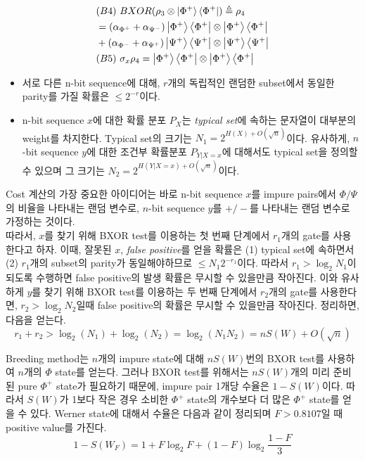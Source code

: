 \documentclass[
]{kaohandt}
\begin{document}
{\begin{equation*}
\begin{aligned}
        &(B4)\ BXOR (\rho_3  \otimes \ket{\Phi^+}\bra{\Phi^+}) \triangleq \rho_4 \\
        & =  (\alpha_{\Phi^+} + \alpha_{\Psi^-}) \left|\Phi^{+}\right\rangle\left\langle\Phi^{+}\right| \otimes\left|\Phi^{+}\right\rangle\left\langle\Phi^{+}\right| \\ 
        & + (\alpha_{\Phi^-} + \alpha_{\Psi^+}) \left|\Psi^{+}\right\rangle\left\langle\Psi^{+}\right| \otimes\left|\Psi^{+}\right\rangle\left\langle\Psi^{+}\right| \\
        &(B5)\ \sigma_x \rho_4 = \left|\Phi^{+}\right\rangle\left\langle\Phi^{+}\right| \otimes\left|\Phi^{+}\right\rangle\left\langle\Phi^{+}\right| 
    \end{aligned}
\end{equation*}}
\begin{itemize}
    \item 서로 다른 n-bit sequence에 대해, $r$개의 독립적인 랜덤한 subset에서 동일한 parity를 가질 확률은 $\leq 2^{-r}$이다.
	\item n-bit sequence $x$에 대한 확률 분포 $P_X$는 \textit{typical set}에 속하는 문자열이 대부분의 weight를 차지한다. Typical set의 크기는 $N_1 = 2^{H(X) + O(\sqrt{n})}$이다. 유사하게, $n$-bit sequence $y$에 대한 조건부 확률분포 $P_{Y|X=x}$에 대해서도 typical set을 정의할 수 있으며 그 크기는 $N_2 = 2^{H(Y|X=x) + O(\sqrt n)}$이다.
\end{itemize}

Cost 계산의 가장 중요한 아이디어는 바로 n-bit sequence $x$를 impure pairs에서 $\Phi / \Psi$의 비율을 나타내는 랜덤 변수로, $n$-bit sequence $y$를 $+/-$를 나타내는 랜덤 변수로 가정하는 것이다.\\
따라서, $x$를 찾기 위해 BXOR test를 이용하는 첫 번째 단계에서 $r_1$개의 gate를 사용한다고 하자. 이때, 잘못된 $x$, \textit{false positive}를 얻을 확률은 (1) typical set에 속하면서 (2) $r_1$개의 subset의 parity가 동일해야하므로 $\le N_1 2^{-r_1}$이다. 따라서 $r_1 > \log_2 N_1$이 되도록 수행하면 false positive의 발생 확률은 무시할 수 있을만큼 작아진다.  이와 유사하게 $y$를 찾기 위해 BXOR test를 이용하는 두 번째 단계에서 $r_2$개의 gate를 사용한다면, $r_2 > \log_2 N_2$일때 false positive의 확률은 무시할 수 있을만큼 작아진다. 정리하면, 다음을 얻는다.
\begin{equation}
    r_1 + r_2 > \log_2(N_1) + \log_2 (N_2) = \log_2(N_1N_2) = nS(W) + O(\sqrt n)
\end{equation}

Breeding method는 $n$개의 impure state에 대해 $nS(W)$번의 BXOR test를 사용하여 $n$개의 $\Phi$ state를 얻는다. 그러나 BXOR test를 위해서는 $nS(W)$개의 미리 준비된 pure $\Phi^+$ state가 필요하기 때문에, impure pair 1개당 수율은 $1-S(W)$이다. 따라서 $S(W)$가 1보다 작은 경우 소비한 $\Phi^+$ state의 개수보다 더 많은 $\Phi^+$ state를 얻을 수 있다.
Werner state에 대해서 수율은 다음과 같이 정리되며 $F > 0.8107$일 때 positive value를 가진다.
\begin{equation}
    1-S\left(W_F\right)=1+F \log _2 F+(1-F) \log _2 \frac{1-F}{3}
\end{equation}
\end{document}
